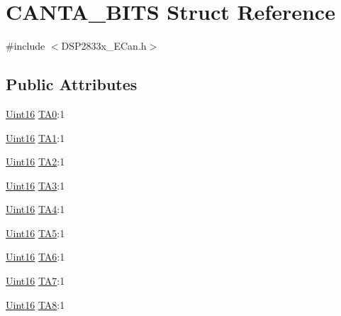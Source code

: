 \hypertarget{struct_c_a_n_t_a___b_i_t_s}{}\section{C\+A\+N\+T\+A\+\_\+\+B\+I\+T\+S Struct Reference}
\label{struct_c_a_n_t_a___b_i_t_s}


{\ttfamily \#include $<$D\+S\+P2833x\+\_\+\+E\+Can.\+h$>$}

\subsection*{Public Attributes}
\begin{DoxyCompactItemize}
\item 
\hyperlink{_d_s_p2833x___device_8h_a59a9f6be4562c327cbfb4f7e8e18f08b}{Uint16} \hyperlink{struct_c_a_n_t_a___b_i_t_s_aee9410495cc3bf5d3fde4c4d52dad9dc}{T\+A0}\+:1
\item 
\hyperlink{_d_s_p2833x___device_8h_a59a9f6be4562c327cbfb4f7e8e18f08b}{Uint16} \hyperlink{struct_c_a_n_t_a___b_i_t_s_a9e64951e62dcf9fc26853e15cbc5dc8f}{T\+A1}\+:1
\item 
\hyperlink{_d_s_p2833x___device_8h_a59a9f6be4562c327cbfb4f7e8e18f08b}{Uint16} \hyperlink{struct_c_a_n_t_a___b_i_t_s_a343d5be8050ff96518c73ad14f626dc0}{T\+A2}\+:1
\item 
\hyperlink{_d_s_p2833x___device_8h_a59a9f6be4562c327cbfb4f7e8e18f08b}{Uint16} \hyperlink{struct_c_a_n_t_a___b_i_t_s_a5d85f9a93b3b1d6332cd897bade5da89}{T\+A3}\+:1
\item 
\hyperlink{_d_s_p2833x___device_8h_a59a9f6be4562c327cbfb4f7e8e18f08b}{Uint16} \hyperlink{struct_c_a_n_t_a___b_i_t_s_ae0e79631f9e22ac55a14ac46b8fb8c7a}{T\+A4}\+:1
\item 
\hyperlink{_d_s_p2833x___device_8h_a59a9f6be4562c327cbfb4f7e8e18f08b}{Uint16} \hyperlink{struct_c_a_n_t_a___b_i_t_s_a410fa9cf1a3efc1a24af2333e44f0783}{T\+A5}\+:1
\item 
\hyperlink{_d_s_p2833x___device_8h_a59a9f6be4562c327cbfb4f7e8e18f08b}{Uint16} \hyperlink{struct_c_a_n_t_a___b_i_t_s_ac597a2a18f729ccb0e91bba1cadb73f0}{T\+A6}\+:1
\item 
\hyperlink{_d_s_p2833x___device_8h_a59a9f6be4562c327cbfb4f7e8e18f08b}{Uint16} \hyperlink{struct_c_a_n_t_a___b_i_t_s_ada548483de52593ad3426ab03e37aa15}{T\+A7}\+:1
\item 
\hyperlink{_d_s_p2833x___device_8h_a59a9f6be4562c327cbfb4f7e8e18f08b}{Uint16} \hyperlink{struct_c_a_n_t_a___b_i_t_s_a641644e7cf8ba06ad8510815de9145b4}{T\+A8}\+:1

\end{DoxyCompactItemize}

